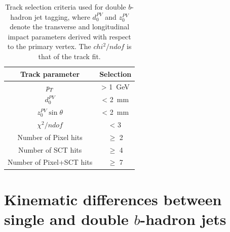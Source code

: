\begin{table}[!hbt] %
\renewcommand{\arraystretch}{1.2}
\centering
\begin{tabular}{ c  c  }
  \hline
  Track parameter &  Selection \\ \hline
  ${\emph{p}_{T}}$   &   > 1~GeV \\
  $d_0^{PV}$   &   < 2~mm \\
  $z_0^{PV}\sin \theta$   &   < 2~mm \\
  $\chi^2 /ndof$   &   < 3 \\
  Number of Pixel hits   &  $\geq$ 2 \\
  Number of SCT hits   &   $\geq$ 4 \\
  Number of Pixel+SCT hits   &  $\geq$ 7 \\ \hline
\end{tabular}
\caption{Track selection criteria used for double $b$-hadron jet tagging, where $d_0^{PV}$ and $z_0^{PV}$ denote the transverse and longitudinal impact parameters derived with respect to the primary vertex. The $chi^2 / ndof$ is that of the track fit.}
\label{tb:tracks}
\end{table}




\section{Kinematic differences between single and double $b$-hadron jets}\label{sec:gbbKine} %




